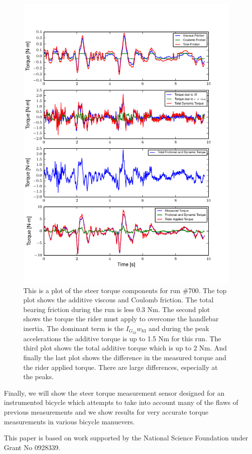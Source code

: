 \documentclass{article}
\begin{document}
\begin{figure}
  \centering
  \includegraphics{steer-torque-components.pdf}
  \caption{This is a plot of the steer torque components for run \#700. The top
  plot shows the additive viscous and Coulomb friction. The total bearing
  friction during the run is less 0.3 Nm. The second plot shows the torque the
  rider must apply to overcome the handlebar inertia. The dominant term is the
  $I_{G_{33}} w_{b3}$ and during the peak accelerations the additive torque is
  up to 1.5 Nm for this run. The third plot shows the total additive torque
  which is up to 2 Nm. And finally the last plot shows the difference in the
  measured torque and the rider applied torque. There are large differences,
  especially at the peaks.}
\end{figure}

Finally, we will show the steer torque measurement sensor designed for an
instrumented bicycle which attempts to take into account many of the flaws of
previous measurements and we show results for very accurate torque measurements
in various bicycle manuevers.

This paper is based on work supported by the National Science Foundation under
Grant No 0928339.



\end{document}
